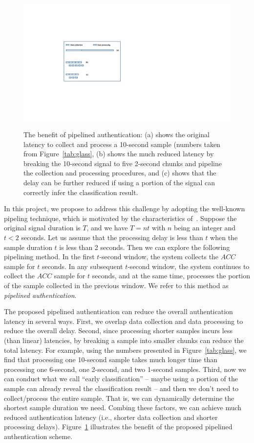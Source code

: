 \begin{figure}\centering
\includegraphics[width=0.65\linewidth]{../figure/pipeline} \\
\caption{\label{fig:pipeline} The benefit of pipelined authentication: (a) shows the original latency to collect and process a 10-second sample (numbers taken from Figure~\ref{tab:glass}, (b) shows the much reduced latency by breaking the 10-second signal to five 2-second chunks and pipeline the collection and processing procedures, and (c) shows that the delay can be further reduced if using a portion of the signal can correctly infer the classification result.}
\end{figure}
In this project, we propose to address this challenge by adopting the well-known pipeling technique, which is motivated by the characteristics of~\systemname. Suppose the original signal duration is $T$, and we have $T=nt$ with $n$ being an integer and $t<2$ seconds. Let us assume that the processing delay is less than $t$ when the sample duration $t$ is less than 2 seconds.  Then we can explore the following pipelining method. In the first $t$-second window, the system collects the $ACC$ sample for $t$ seconds. In any subsequent $t$-second window, the system continues to collect the $ACC$ sample for $t$ seconds, and at the same time, processes the portion of the sample collected in the previous window. We refer to this method as \emph{pipelined authentication}.


The proposed pipelined authentication can reduce the overall authentication latency in several ways. First, we overlap data collection and data processing to reduce the overall delay. Second, since processing shorter samples incurs less (than linear) latencies, by breaking a sample into smaller chunks can reduce the total latency. For example, using the numbers presented in Figure~\ref{tab:glass}, we find that processing one 10-second sample takes much longer time than processing one 6-second, one 2-second, and two 1-second samples. Third, now we can conduct what we call ``early classification'' -- maybe using a portion of the sample can already reveal the classification result -- and then we don't need to collect/process the entire sample. That is, we can dynamically determine the shortest sample duration we need. Combing these factors, we can achieve much reduced authentication latency (i.e., shorter data collection and shorter processing delays). Figure~\ref{fig:pipeline} illustrates the benefit of the proposed pipelined authentication scheme.



